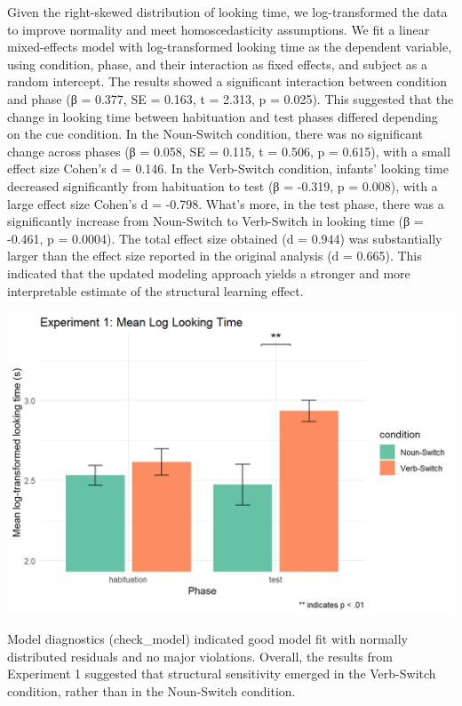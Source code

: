 \documentclass[
  man]{apa6}
\begin{document}
Given the right-skewed distribution of looking time, we log-transformed the data to improve normality and meet homoscedasticity assumptions. We fit a linear mixed-effects model with log-transformed looking time as the dependent variable, using condition, phase, and their interaction as fixed effects, and subject as a random intercept.
The results showed a significant interaction between condition and phase (β = 0.377, SE = 0.163, t = 2.313, p = 0.025). This suggested that the change in looking time between habituation and test phases differed depending on the cue condition. In the Noun-Switch condition, there was no significant change across phases (β = 0.058, SE = 0.115, t = 0.506, p = 0.615), with a small effect size Cohen's d = 0.146. In the Verb-Switch condition, infants' looking time decreased significantly from habituation to test (β = -0.319, p = 0.008), with a large effect size Cohen's d = -0.798. What's more, in the test phase, there was a significantly increase from Noun-Switch to Verb-Switch in looking time (β = -0.461, p = 0.0004). The total effect size obtained (d = 0.944) was substantially larger than the effect size reported in the original analysis (d = 0.665). This indicated that the updated modeling approach yields a stronger and more interpretable estimate of the structural learning effect.

\includegraphics{pic/Exp1.png}

Model diagnostics (check\_model) indicated good model fit with normally distributed residuals and no major violations. Overall, the results from Experiment 1 suggested that structural sensitivity emerged in the Verb-Switch condition, rather than in the Noun-Switch condition.
\end{document}
